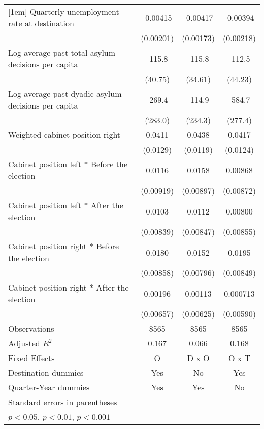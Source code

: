 \begin{table}[htbp]
\begin{tabular}{l*{3}{c}}
[1em]
Quarterly unemployment rate at destination&    -0.00415\sym{*}  &    -0.00417\sym{*}  &    -0.00394         \\
                    &   (0.00201)         &   (0.00173)         &   (0.00218)         \\
[1em]
Log average past total asylum decisions per capita&      -115.8\sym{**} &      -115.8\sym{**} &      -112.5\sym{*}  \\
                    &     (40.75)         &     (34.61)         &     (44.23)         \\
[1em]
Log average past dyadic asylum decisions per capita&      -269.4         &      -114.9         &      -584.7\sym{*}  \\
                    &     (283.0)         &     (234.3)         &     (277.4)         \\
[1em]
Weighted cabinet position right&      0.0411\sym{**} &      0.0438\sym{***}&      0.0417\sym{**} \\
                    &    (0.0129)         &    (0.0119)         &    (0.0124)         \\
[1em]
Cabinet position left * Before the election&      0.0116         &      0.0158         &     0.00868         \\
                    &   (0.00919)         &   (0.00897)         &   (0.00872)         \\
[1em]
Cabinet position left * After the election&      0.0103         &      0.0112         &     0.00800         \\
                    &   (0.00839)         &   (0.00847)         &   (0.00855)         \\
[1em]
Cabinet position right * Before the election&      0.0180\sym{*}  &      0.0152         &      0.0195\sym{*}  \\
                    &   (0.00858)         &   (0.00796)         &   (0.00849)         \\
[1em]
Cabinet position right * After the election&     0.00196         &     0.00113         &    0.000713         \\
                    &   (0.00657)         &   (0.00625)         &   (0.00590)         \\
\hline
Observations        &        8565         &        8565         &        8565         \\
Adjusted \(R^{2}\)  &       0.167         &       0.066         &       0.168         \\
Fixed Effects       &           O         &       D x O         &       O x T         \\
Destination dummies &         Yes         &          No         &         Yes         \\
Quarter-Year dummies&         Yes         &         Yes         &          No         \\
\hline\hline
\multicolumn{4}{l}{\footnotesize Standard errors in parentheses}\\
\multicolumn{4}{l}{\footnotesize \sym{*} \(p<0.05\), \sym{**} \(p<0.01\), \sym{***} \(p<0.001\)}\\
\end{tabular}
\end{table}
